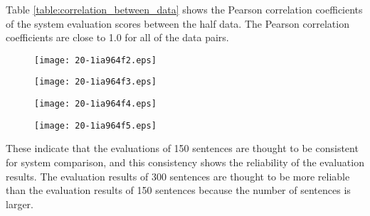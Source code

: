 \documentclass[english]{jnlp_1.4}
\begin{document}
Table \ref{table:correlation_between_data} shows the Pearson correlation coefficients of the system evaluation scores between the half data.
The Pearson correlation coefficients are close to 1.0 for all of the data pairs.

\begin{figure}[b]
\setlength{\captionwidth}{192pt}
\begin{minipage}[b]{200pt}
\centerline{\texttt{[image: 20-1ia964f2.eps]}}
\label{fig:comparison_data_CE_adequacy}
\end{minipage}
\hfill
\begin{minipage}[b]{200pt}
\centerline{\texttt{[image: 20-1ia964f3.eps]}}
\label{fig:comparison_data_CE_acceptability}
\end{minipage}
\end{figure}
\begin{figure}[t]
\setlength{\captionwidth}{192pt}
\begin{minipage}[b]{200pt}
\centerline{\texttt{[image: 20-1ia964f4.eps]}}
\label{fig:comparison_data_JE_adequacy}
\end{minipage}
\hfill
\begin{minipage}[b]{200pt}
\centerline{\texttt{[image: 20-1ia964f5.eps]}}
\label{fig:comparison_data_JE_acceptability}
\end{minipage}
\end{figure}

These indicate that the evaluations of 150 sentences are thought to be consistent for system comparison, and this consistency shows the reliability of the evaluation results.
The evaluation results of 300 sentences are thought to be more reliable than the evaluation results of 150 sentences because the number of sentences is larger.
\end{document}
